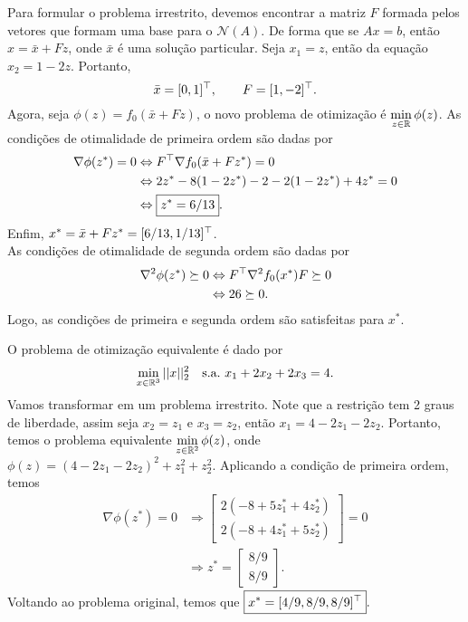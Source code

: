 \begin{questions}
\begin{solution}
\begin{parts}
    Para formular o problema irrestrito, devemos encontrar a matriz $F$ formada pelos vetores que formam uma base para o $\mathscr{N}(A)$. De forma que se $Ax=b$, então $x=\bar x + Fz$, onde $\bar x$ é uma solução particular. Seja $x_1 = z$, então da equação $x_2 = 1-2z$. Portanto,
    \[\bar x = [0, 1]^\top, \qquad F = [1, -2]^\top.\]
    Agora, seja $\phi(z) = f_0(\bar x + Fz)$, o novo problema de otimização é $\displaystyle\min_{z\in{\mathbb R}} \phi(z)$.
    As condições de otimalidade de primeira ordem são dadas por
    \begin{align*}
        \nabla \phi(z^*) = 0 &\Leftrightarrow F^\top \nabla f_0(\bar x + Fz^*) = 0\\
            &\Leftrightarrow 2z^* - 8(1-2z^*) -2 -2(1-2z^*) + 4z^* = 0\\
            &\Leftrightarrow \boxed{z^* = 6/13}.
    \end{align*}
    Enfim, $x^* = \bar x + Fz^* = [6/13,1/13]^\top$.\\
    As condições de otimalidade de segunda ordem são dadas por
    \begin{align*}
        \nabla^2 \phi(z^*) \succeq 0 &\Leftrightarrow F^\top \nabla^2 f_0(x^*) F \succeq 0\\
            &\Leftrightarrow 26 \succeq 0.
    \end{align*}
    Logo, as condições de primeira e segunda ordem são satisfeitas para $x^*$.
    \end{parts}
\end{solution}

\begin{solution}
    O problema de otimização equivalente é dado por
    \[\min_{x\in{\mathbb R}^3} ||x||_2^2\quad
    \text{s.a.}~x_1 + 2x_2 + 2x_3 = 4.\]
    Vamos transformar em um problema irrestrito. Note que a restrição tem 2 graus de liberdade, assim seja $x_2 = z_1$ e $x_3 = z_2$, então $x_1 = 4-2z_1-2z_2$.
    Portanto, temos o problema equivalente $\displaystyle\min_{z\in{\mathbb R}^2}\phi(z)$, onde $\phi(z) = (4-2z_1-2z_2)^2+z_1^2+z_2^2$. Aplicando a condição de primeira ordem, temos
    \begin{align*}
        \nabla \phi(z^*) = 0
        &\Rightarrow
        \begin{bmatrix}
            2 (-8 + 5 z_1^* + 4 z_2^*)\\
            2 (-8 + 4 z_1^* + 5 z_2^*)
        \end{bmatrix} = 0\\
        &\Rightarrow \boxed{z^* =
        \begin{bmatrix}
            8/9\\
            8/9
        \end{bmatrix}}.
    \end{align*}
    Voltando ao problema original, temos que
    $\boxed{x^* = [4/9,8/9,8/9]^\top}.$
\end{solution}


\end{questions}
